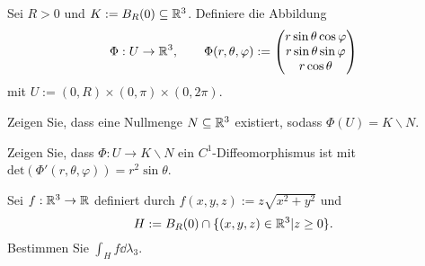 \begin{Problem}
	Sei $R>0$ und $K:=B_R(0)\subseteq \mathbb{R}^3$. Definiere die Abbildung
	\[
	\Phi:U\to \mathbb{R}^3,\qquad\Phi(r,\theta,\varphi):=\begin{pmatrix} r\sin\theta\cos\varphi \\ r\sin\theta\sin\varphi \\ r\cos\theta \end{pmatrix} 
\]
mit $U:=(0,R)\times (0,\pi)\times(0,2\pi)$.
\begin{parts}
\item Zeigen Sie, dass eine Nullmenge $N\subseteq \mathbb{R}^3$ existiert, sodass $\Phi(U)=K\backslash N$.
\item Zeigen Sie, dass $\Phi:U\to K\backslash N$ ein $C^1$-Diffeomorphismus ist mit $\text{det}(\Phi'(r,\theta,\varphi))=r^2\sin\theta$.
\item Sei $f:\mathbb{R}^3\to \mathbb{R}$ definiert durch $f(x,y,z):=z\sqrt{x^2+y^2} $ und
	\[
	H:=B_R(0)\cap \{(x,y,z)\in \mathbb{R}^3|z\ge 0\} 
	.\] 
	Bestimmen Sie $\int_H f\dd{\lambda_3}$.
\end{parts}
\end{Problem}
